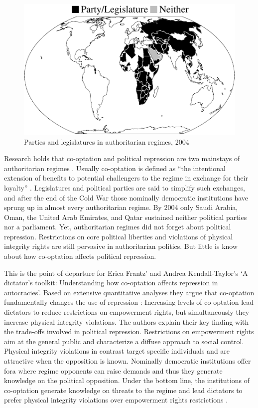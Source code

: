 \begin{figure}
\centering
\includegraphics[width=\linewidth]{./sections/01intro/worldmapTermpaperIntro.pdf}
\caption{Parties and legislatures in authoritarian regimes, 2004}
\label{fig:worldmapIntro}
\end{figure}
Research holds that co-optation and political repression
are two mainstays of authoritarian regimes 
\citep[21f.]{Gerschewski.2013}. Usually co-optation 
is defined as ``the intentional extension of benefits to 
potential challengers to the regime in exchange for their 
loyalty'' \citep[333]{Frantz.2014}. Legislatures and 
political parties are said to simplify such exchanges, and
after the end of the Cold War those nominally democratic 
institutions have sprung up in almost every authoritarian 
regime. By 2004 only Saudi Arabia, Oman, the 
United Arab Emirates, and Qatar sustained neither political 
parties nor a parliament. Yet, authoritarian regimes did not 
forget about political repression. Restrictions on core 
political liberties and violations of physical integrity 
rights are still pervasive in authoritarian politics. But 
little is know about how co-optation affects political 
repression.

This is the point of departure for Erica Frantz' and Andrea 
Kendall-Taylor's \citeyearpar{Frantz.2014} `A dictator’s 
toolkit: Understanding how co-optation affects repression in 
autocracies'. Based on extensive quantitative analyses they 
argue that co-optation fundamentally changes the use of 
repression \citep[332]{Frantz.2014}: Increasing levels of 
co-optation lead dictators to reduce restrictions on 
empowerment rights, but simultaneously they increase 
physical integrity violations. The authors explain their 
key finding with the trade-offs involved in political 
repression. Restrictions on empowerment rights aim at the 
general public and characterize a diffuse approach to
social control. Physical integrity violations in contrast 
target specific individuals and are attractive when the 
opposition is known. Nominally democratic institutions offer
fora where regime opponents can raise demands and
thus they generate knowledge on the political opposition. 
Under the bottom line, the institutions of co-optation 
generate knowledge on threats to the regime and lead 
dictators to prefer physical integrity violations over 
empowerment rights restrictions 
\citep[337]{Frantz.2014}.

